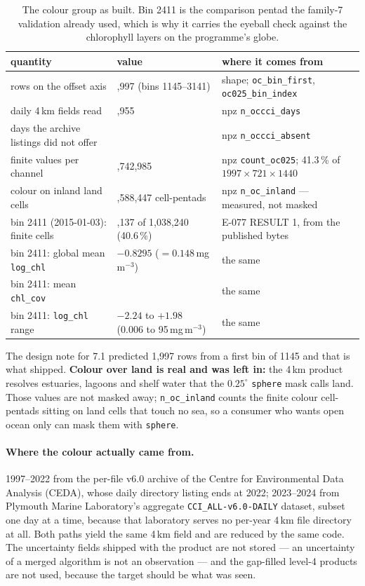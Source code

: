 \documentclass[10pt]{article}
\newcommand{\code}[1]{\texttt{#1}}
\begin{document}
\begin{table}[h]
\centering\setlength{\tabcolsep}{5pt}\footnotesize
\begin{tabular}{@{}>{\raggedright\arraybackslash}p{4.6cm}>{\raggedright\arraybackslash}p{2.9cm}>{\raggedright\arraybackslash}p{7.2cm}@{}}
\toprule
quantity & value & where it comes from \\
\midrule
rows on the offset axis & 1,997 (bins 1145--3141) & shape; \code{oc\_bin\_first}, \code{oc025\_bin\_index} \\
daily 4\,km fields read & 9,955 & npz \code{n\_occci\_days} \\
days the archive listings did not offer & 26 & npz \code{n\_occci\_absent} \\
finite values per channel & 855,742,985 & npz \code{count\_oc025}; 41.3\,\% of $1997\times721\times1440$ \\
colour on inland land cells & 4,588,447 cell-pentads & npz \code{n\_oc\_inland} --- measured, not masked \\
bin 2411 (2015-01-03): finite cells & 421,137 of 1,038,240 (40.6\,\%) & E-077 RESULT 1, from the published bytes \\
bin 2411: global mean \code{log\_chl} & $-0.8295$ ($=0.148$\,mg\,m$^{-3}$) & the same \\
bin 2411: mean \code{chl\_cov} & 0.249 & the same \\
bin 2411: \code{log\_chl} range & $-2.24$ to $+1.98$ (0.006 to 95\,mg\,m$^{-3}$) & the same \\
\bottomrule
\end{tabular}
\caption{The colour group as built. Bin 2411 is the comparison pentad the
family-7 validation already used, which is why it carries the eyeball check
against the chlorophyll layers on the programme's globe.}
\end{table}

The design note for 7.1 predicted 1,997 rows from a first bin of 1145 and that
is what shipped. \textbf{Colour over land is real and was left in:} the 4\,km
product resolves estuaries, lagoons and shelf water that the $0.25^\circ$
\code{sphere} mask calls land. Those values are not masked away;
\code{n\_oc\_inland} counts the finite colour cell-pentads sitting on land
cells that touch no sea, so a consumer who wants open ocean only can mask them
with \code{sphere}.

\paragraph{Where the colour actually came from.} 1997--2022 from the per-file
v6.0 archive of the Centre for Environmental Data Analysis (CEDA), whose daily
directory listing ends at 2022; 2023--2024 from Plymouth Marine Laboratory's
aggregate \code{CCI\_ALL-v6.0-DAILY} dataset, subset one day at a time,
because that laboratory serves no per-year 4\,km file directory at all. Both
paths yield the same 4\,km field and are reduced by the same code. The
uncertainty fields shipped with the product are not stored --- an uncertainty
of a merged algorithm is not an observation --- and the gap-filled level-4
products are not used, because the target should be what was seen.
\end{document}
